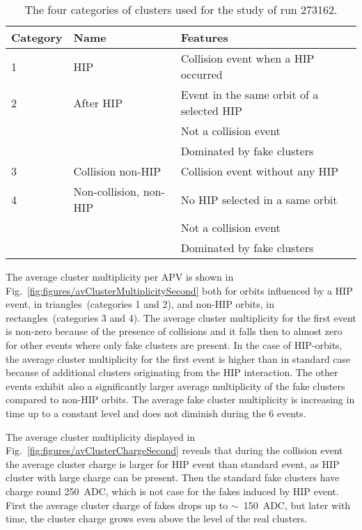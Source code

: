 \begin{table}[h]
\begin{center}
\begin{tabular}{|l|l|l|}
\hline
Category & Name  & Features \\
\hline
1 & HIP & Collision event when a HIP occurred \\
\hline
2 & After HIP & Event in the same orbit of a selected HIP \\
& & Not a collision event \\
& & Dominated by fake clusters \\
\hline
3 & Collision non-HIP & Collision event without any HIP \\
\hline
4 & Non-collision, non-HIP  & No HIP selected in a same orbit \\
& & Not a collision event \\
& & Dominated by fake clusters \\
\hline
\end{tabular}
\caption[Table caption text]{The four categories of clusters used for the study of run 273162. }
\label{tab:eventCategories}
\end{center}
\end{table}

The average cluster multiplicity per APV is shown in Fig.~\ref{fig:figures/avClusterMultiplicitySecond} both for orbits influenced by a HIP event, in triangles~(categories 1 and 2), and non-HIP orbits, in rectangles~(categories 3 and 4). The average cluster multiplicity for the first event is non-zero because of the presence of collisions and it falls then to almost zero for other events where only fake clusters are present. In the case of HIP-orbits, the average cluster multiplicity for the first event is higher than in standard case because of additional clusters originating from the HIP interaction. The other events exhibit also a significantly larger average multiplicity of the fake clusters compared to non-HIP orbits. The average fake cluster multiplicity is increasing in time up to a constant level and does not diminish during the 6 events. 

The average cluster multiplicity displayed in Fig.~\ref{fig:figures/avClusterChargeSecond} reveals that during the collision event the average cluster charge is larger for HIP event than standard event, as HIP cluster with large charge can be present. Then the standard fake clusters have charge round 250~ADC, which is not case for the fakes induced by HIP event. First the average cluster charge of fakes drops up to $\sim$~150~ADC, but later with time, the cluster charge grows even above the level of the real clusters. 

